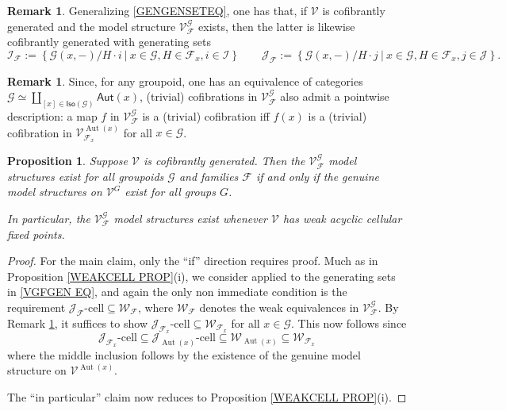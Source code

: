 \documentclass[a4paper,10pt
]{article}%
\numberwithin{equation}{section}
\numberwithin{figure}{section}
\newtheorem{proposition}[equation]{Proposition}%
\theoremstyle{definition} %
\newtheorem{remark}[equation]{Remark}%
\DeclareMathOperator{\Aut}{Aut}%
\newcommand{\F}{\ensuremath{\mathcal F}}
\newcommand{\V}{\ensuremath{\mathcal V}}
\newcommand{\G}{\ensuremath{\mathcal G}}
\newcommand{\1}{\ensuremath{\mathbbm 1}}%
\begin{document}
\begin{remark}\label{VGFGEN REM}
	Generalizing \eqref{GENGENSETEQ}, one has that,
	if $\V$ is cofibrantly generated and 
	the model structure $\V^{\G}_{\F}$ exists,
	then the latter is likewise cofibrantly generated with generating sets
	\begin{equation}\label{VGFGEN EQ}
	\mathcal I_{\F} := \left\{
	\G(x,-)/H \cdot i
	\ | \ x \in \G, H \in \F_x, i\in \mathcal{I}
	\right\}
	\qquad
	\mathcal J_{\F} := \left\{
	\G(x,-)/H \cdot j
	\ | \ x \in \G, H \in \F_x, j\in \mathcal{J}
	\right\}.
	\end{equation}
\end{remark}


\begin{remark}\label{SIGMACOF_REM}
	Since, for any groupoid, one has an equivalence of categories
	$\mathcal{G} \simeq 
	\coprod_{[x] \in \mathsf{Iso}(\mathcal{G})}
	\mathsf{Aut}(x)$,
	(trivial) cofibrations in $\V^{\G}_{\F}$
	also admit a pointwise description: 
	a map $f$ in $\V^\G_\F$ is a (trivial) cofibration iff $f(x)$ is a (trivial) cofibration in $\V^{\Aut(x)}_{\F_x}$ for all $x \in \G$.
\end{remark}



\begin{proposition}\label{ALLEQ PROP}
	Suppose $\V$ is cofibrantly generated.
	Then the $\V^{\G}_{\F}$
	model structures exist for all 
	groupoids $\G$ and families $\F$
	if and only if
	the genuine model structures on $\V^G$
	exist for all groups $G$.
	
	In particular, the $\V^{\G}_{\F}$
	model structures exist whenever $\V$ has weak acyclic cellular fixed points.
\end{proposition}

\begin{proof}
	For the main claim, only the ``if'' direction requires proof.
	Much as in Proposition \ref{WEAKCELL PROP}(i), 
	we consider \cite[Theorem 2.1.19]{Hov99}
	applied to the generating sets in \eqref{VGFGEN EQ},
	and again the only non immediate condition is the requirement
	$\mathcal{J}_{\F}\text{-cell} \subseteq \mathcal{W}_{\F}$,
	where $\mathcal{W}_{\F}$ denotes the weak equivalences 
	in $\V^{\G}_{\F}$.
	By Remark \ref{SIGMACOF_REM}, it suffices to show 
	$\mathcal{J}_{\F_x}\text{-cell} \subseteq \mathcal{W}_{\F_x}$
	for all $x \in \G$.
	This now follows since
	\begin{equation}\label{FAMTOGEN EQ}
	\mathcal{J}_{\F_x}\text{-cell} \subseteq 
	\mathcal{J}_{\Aut(x)}\text{-cell} \subseteq 
	\mathcal{W}_{\Aut(x)} \subseteq 
	\mathcal{W}_{\F_x}
	\end{equation}
	where the middle inclusion follows by the existence of the 
	genuine model structure on $\V^{\Aut(x)}$.
	
	The ``in particular'' claim now reduces to Proposition \ref{WEAKCELL PROP}(i).
\end{proof}
\end{document}
